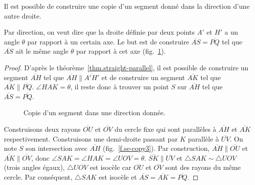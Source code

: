 \begin{theorem}\label{thm.straight-direction}
Il est possible de construire une copie d'un segment  donné dans la direction d'une autre droite.
\end{theorem}

Par \og direction\fg{}, on veut dire  que la droite définie par deux points $A'$ et $H'$ a un angle $\theta$ par rapport à un certain axe. Le but est de construire $\overline{AS}=\overline{PQ}$ tel que $\overline{AS}$ ait le même angle $\theta$ par rapport à cet axe  (fig.~\ref{f.se-copy1}).

\begin{proof}
D'après le théorème~\ref{thm.straight-parallel}, il est possible de construire un segment  $\overline{AH}$ tel que $\overline{AH}\parallel\overline{A'H'}$ et de construire un segment  $\overline{AK}$ tel que $\overline{AK}\parallel\overline{PQ}$.
$\angle HAK=\theta$, il reste donc à trouver un point $S$ sur $\overline{AH}$ tel que $\overline{AS}=\overline{PQ}$.

\begin{figure}[htbp]
\centering  
{}
\caption{Copie d'un segment dans une direction donnée.}\label{f.se-copy1}
\end{figure}

Construisons deux rayons $\overline{OU}$ et $\overline{OV}$ du cercle fixe qui sont parallèles à $\overline{AH}$ et $\overline{AK}$ respectivement. Construisons une demi-droite passant par $K$ parallèle à $\overline{UV}$. On note $S$ son intersection avec $\overline{AH}$ (fig.~\ref{f.se-copy3}). Par construction, $\overline{AH}\parallel\overline{OU}$ et $\overline{AK}\parallel\overline{OV}$, donc $\angle SAK=\angle HAK=\angle UOV=\theta$.  $\overline{SK}\parallel\overline{UV}$ et $\triangle SAK\sim\triangle UOV$ (trois angles égaux), $\triangle UOV$ est isocèle car $\overline{OU}$ et $\overline{OV}$ sont des rayons du même cercle. Par conséquent, $\triangle SAK$ est isocèle et 
$\overline{AS}=\overline{AK}=\overline{PQ}$.
\end{proof}


